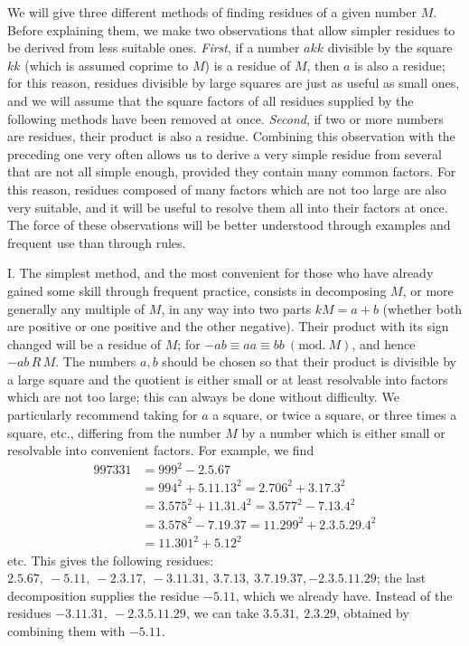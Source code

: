 We will give three different methods of finding residues of a given number \(M\). Before explaining them, we make two observations that allow simpler residues to be derived from less suitable ones. \textit{First}, if a number \(akk\) divisible by the square \(kk\) (which is assumed coprime to \(M\)) is a residue of \(M\), then \(a\) is also a residue; for this reason, residues divisible by large
squares are just as useful as small ones, and we will assume that the square factors of all residues supplied by the following methods have been removed at once. \textit{Second}, if two or more numbers are residues, their product is also a residue. Combining this observation with the preceding one very often allows us to derive a very simple residue from several that are not all simple enough, provided they contain many common factors. For this reason, residues composed of many factors which are not too large are also very suitable, and it will be useful to resolve them all into their factors at once. The force of these observations will be better understood through examples and frequent use than through rules.

I. The simplest method, and the most convenient for those who have already gained some skill through frequent practice, consists in decomposing \(M\), or more generally any multiple of \(M\), in any way into two parts \(kM=a+b\) (whether both are positive or one positive and the other negative). Their product with its sign changed will be a residue of \(M\); for \(-ab\equiv aa\equiv bb\ (\mathrm{mod.}\ M)\), and hence \(-ab\,R\,M\). The numbers \(a,\allowbreak b\) should be chosen so that their product is divisible by a large square and the quotient is either small or at least resolvable into factors which are not too large; this can always be done without difficulty. We particularly recommend taking for \(a\) a square, or twice a square, or three times a square, etc., differing from the number \(M\) by a number which is either small or resolvable into convenient factors. For example, we find \[\begin{aligned}
997331&=999^2-2.5.67\\
&=994^2+5.11.13^2=2.706^2+3.17.3^2\\
&=3.575^2+11.31.4^2=3.577^2-7.13.4^2\\
&=3.578^2-7.19.37=11.299^2+2.3.5.29.4^2\\
&=11.301^2+5.12^2
\end{aligned}\] etc. This gives the following residues: \(2.5.67,\allowbreak \ -5.11,\allowbreak \ -2.3.17,\allowbreak \ -3.11.31,\allowbreak \ 3.7.13,\allowbreak \ 3.7.19.37,\allowbreak -2.3.5.11.29\); the last decomposition supplies the residue \(-5.11\), which we already have. Instead of the residues \(-3.11.31,\allowbreak \ -2.3.5.11.29\), we can take \(3.5.31,\allowbreak \ 2.3.29\), obtained by combining them with \(-5.11\).

